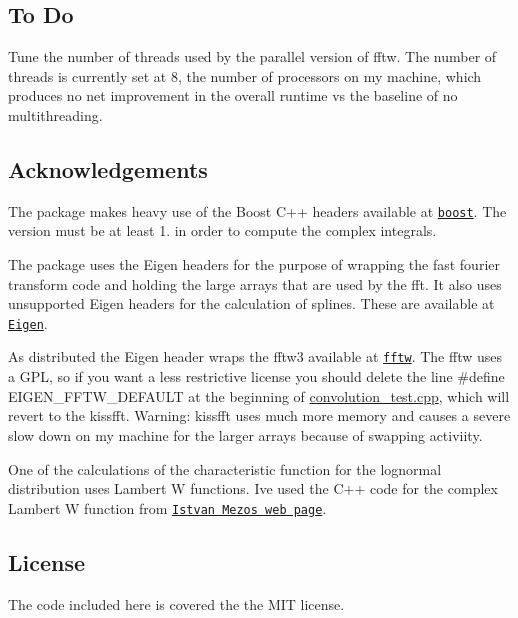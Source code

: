 \subsection*{To Do}


\begin{DoxyItemize}
\item Tune the number of threads used by the parallel version of fftw. The number of threads is currently set at 8, the number of processors on my machine, which produces no net improvement in the overall runtime vs the baseline of no multithreading.
\end{DoxyItemize}

\subsection*{Acknowledgements}


\begin{DoxyEnumerate}
\item The package makes heavy use of the Boost C++ headers available at \href{http://www.boost.org}{\tt boost}. The version must be at least 1. in order to compute the complex integrals.
\item The package uses the Eigen headers for the purpose of wrapping the fast fourier transform code and holding the large arrays that are used by the fft. It also uses unsupported Eigen headers for the calculation of splines. These are available at \href{http://www.eigen.tuxfamily.org}{\tt Eigen}.
\item As distributed the Eigen header wraps the fftw3 available at \href{http://fftw.org}{\tt fftw}. The fftw uses a G\+PL, so if you want a less restrictive license you should delete the line \#define E\+I\+G\+E\+N\+\_\+\+F\+F\+T\+W\+\_\+\+D\+E\+F\+A\+U\+LT at the beginning of \mbox{\hyperlink{convolution__test_8cpp}{convolution\+\_\+test.\+cpp}}, which will revert to the kissfft. Warning\+: kissfft uses much more memory and causes a severe slow down on my machine for the larger arrays because of swapping activiity.
\item One of the calculations of the characteristic function for the lognormal distribution uses Lambert W functions. I\textquotesingle{}ve used the C++ code for the complex Lambert W function from \href{https://sites.google.com/site/istvanmezo81/others}{\tt Istvan Mezo\textquotesingle{}s web page}.
\end{DoxyEnumerate}

\subsection*{License}

The code included here is covered the the M\+IT license. 